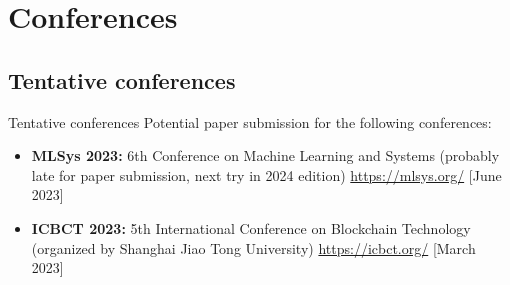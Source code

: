 

\section{Conferences}

\subsection{Tentative conferences}

\begin{frame}{Tentative conferences}
	Potential paper submission for the following conferences:
  \begin{itemize}
  	\item \textbf{MLSys 2023:} 6th Conference on Machine Learning and Systems (probably late for paper submission, next try in 2024 edition) \url{https://mlsys.org/} [June 2023]
  	\item \textbf{ICBCT 2023:} 5th International Conference on Blockchain Technology (organized by Shanghai Jiao Tong University) \url{https://icbct.org/} [March 2023]
  \end{itemize}
\end{frame}